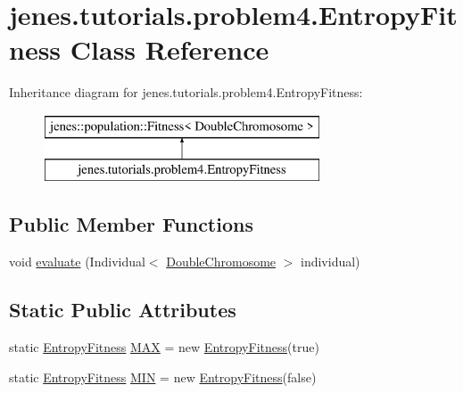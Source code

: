 \hypertarget{classjenes_1_1tutorials_1_1problem4_1_1_entropy_fitness}{\section{jenes.\-tutorials.\-problem4.\-Entropy\-Fitness Class Reference}
\label{classjenes_1_1tutorials_1_1problem4_1_1_entropy_fitness}
}
Inheritance diagram for jenes.\-tutorials.\-problem4.\-Entropy\-Fitness\-:\begin{figure}[H]
\begin{center}
\leavevmode
\includegraphics[height=2.000000cm]{classjenes_1_1tutorials_1_1problem4_1_1_entropy_fitness}
\end{center}
\end{figure}
\subsection*{Public Member Functions}
\begin{DoxyCompactItemize}
\item 
void \hyperlink{classjenes_1_1tutorials_1_1problem4_1_1_entropy_fitness_a0e101073e060b84386ee2c10eb80a2f0}{evaluate} (Individual$<$ \hyperlink{classjenes_1_1chromosome_1_1_double_chromosome}{Double\-Chromosome} $>$ individual)
\end{DoxyCompactItemize}
\subsection*{Static Public Attributes}
\begin{DoxyCompactItemize}
\item 
static \hyperlink{classjenes_1_1tutorials_1_1problem4_1_1_entropy_fitness}{Entropy\-Fitness} \hyperlink{classjenes_1_1tutorials_1_1problem4_1_1_entropy_fitness_a015b775a1b2b1f1d5bc1eb82a560fe9a}{M\-A\-X} = new \hyperlink{classjenes_1_1tutorials_1_1problem4_1_1_entropy_fitness}{Entropy\-Fitness}(true)
\item 
static \hyperlink{classjenes_1_1tutorials_1_1problem4_1_1_entropy_fitness}{Entropy\-Fitness} \hyperlink{classjenes_1_1tutorials_1_1problem4_1_1_entropy_fitness_ab9c1db9f5da22216604985e98b6fc7e4}{M\-I\-N} = new \hyperlink{classjenes_1_1tutorials_1_1problem4_1_1_entropy_fitness}{Entropy\-Fitness}(false)
\end{DoxyCompactItemize}
